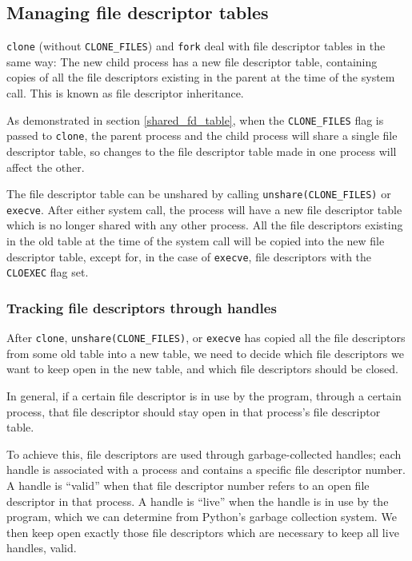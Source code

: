\documentclass[letterpaper,twocolumn,10pt]{article}
\begin{document}
\subsection{Managing file descriptor tables}\label{fdtables}
\texttt{clone} (without \verb|CLONE_FILES|) and \texttt{fork}
deal with file descriptor tables in the same way:
The new child process has a new file descriptor table,
containing copies of all the file descriptors existing in the parent at the time of the system call.
This is known as file descriptor inheritance.

As demonstrated in section \ref{shared_fd_table},
when the \verb|CLONE_FILES| flag is passed to \texttt{clone},
the parent process and the child process will share a single file descriptor table,
so changes to the file descriptor table made in one process will affect the other.

The file descriptor table can be unshared by calling \verb|unshare(CLONE_FILES)| or \texttt{execve}.
After either system call, the process will have a new file descriptor table
which is no longer shared with any other process.
All the file descriptors existing in the old table at the time of the system call
will be copied into the new file descriptor table,
except for, in the case of \texttt{execve}, file descriptors with the \texttt{CLOEXEC} flag set.
\subsubsection{Tracking file descriptors through handles}
After \texttt{clone}, \verb|unshare(CLONE_FILES)|, or \texttt{execve}
has copied all the file descriptors from some old table into a new table,
we need to decide which file descriptors we want to keep open in the new table,
and which file descriptors should be closed.

In general, if a certain file descriptor is in use by the program,
through a certain process,
that file descriptor should stay open in that process's file descriptor table.

To achieve this, file descriptors are used through garbage-collected handles;
each handle is associated with a process and contains a specific file descriptor number.
A handle is ``valid''
when that file descriptor number refers to an open file descriptor in that process.
A handle is ``live''
when the handle is in use by the program, which we can determine
from Python's garbage collection system.
We then keep open exactly those file descriptors which are necessary to keep all live handles, valid.
\end{document}
